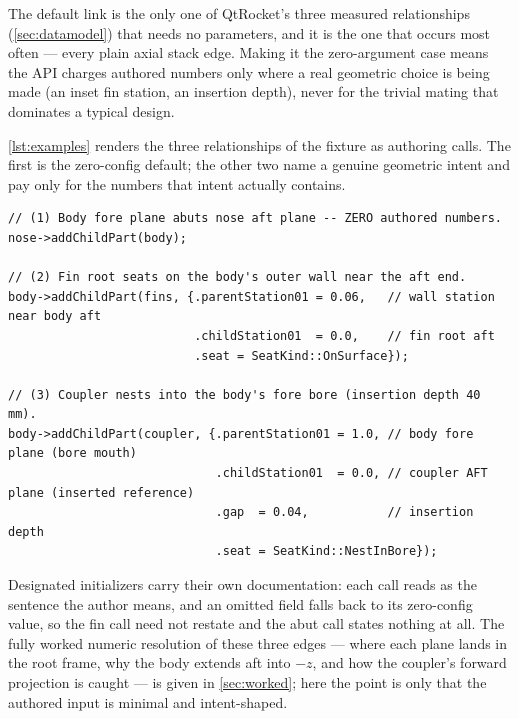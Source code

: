 \begin{keyinsight}
The default link is the only one of QtRocket's three measured relationships
(\cref{sec:datamodel}) that needs no parameters, and it is the one that occurs most often
--- every plain axial stack edge. Making it the zero-argument case means the API charges
authored numbers only where a real geometric choice is being made (an inset fin station,
an insertion depth), never for the trivial mating that dominates a typical design.
\end{keyinsight}

\cref{lst:examples} renders the three relationships of the  fixture as
authoring calls. The first is the zero-config default; the other two name a genuine
geometric intent and pay only for the numbers that intent actually contains.

\begin{listing}[htbp]
\begin{verbatim}
// (1) Body fore plane abuts nose aft plane -- ZERO authored numbers.
nose->addChildPart(body);

// (2) Fin root seats on the body's outer wall near the aft end.
body->addChildPart(fins, {.parentStation01 = 0.06,   // wall station near body aft
                          .childStation01  = 0.0,    // fin root aft
                          .seat = SeatKind::OnSurface});

// (3) Coupler nests into the body's fore bore (insertion depth 40 mm).
body->addChildPart(coupler, {.parentStation01 = 1.0, // body fore plane (bore mouth)
                             .childStation01  = 0.0, // coupler AFT plane (inserted reference)
                             .gap  = 0.04,           // insertion depth
                             .seat = SeatKind::NestInBore});
\end{verbatim}
\caption{The three  relationships as  calls: the
defaulted abut, an  fin seat, and a  coupler.}\label{lst:examples}
\end{listing}

Designated initializers carry their own documentation: each call reads as the sentence the
author means, and an omitted field falls back to its zero-config value, so the
 fin call need not restate  and the abut call states nothing
at all. The fully worked numeric resolution of these three edges --- where each plane lands
in the root frame, why the body extends aft into $-z$, and how the coupler's forward
projection is caught --- is given in \cref{sec:worked}; here the point is only that the
authored input is minimal and intent-shaped.

